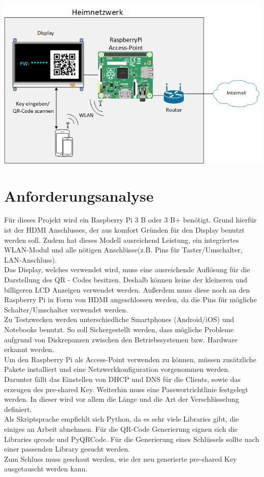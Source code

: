 \documentclass[a4paper,11pt,singlespacing]{article}
\begin{document}
	\includegraphics[scale=0.6]{skizze}
	
	\section{Anforderungsanalyse}

	Für dieses Projekt wird ein Raspberry Pi 3 B oder 3 B+ benötigt. Grund hierfür ist der HDMI Anschlusses, der aus komfort Gründen für den Display benutzt werden soll. Zudem hat dieses Modell ausreichend Leistung, ein integriertes WLAN-Modul und alle nötigen Anschlüsse(z.B. Pins für Taster/Umschalter, LAN-Anschluss). \\
	Das Display, welches verwendet wird, muss eine ausreichende Auflösung für die Darstellung des QR - Codes besitzen. Deshalb können keine der kleineren und billigeren LCD Anzeigen verwendet werden. Außerdem muss diese noch an den Raspberry Pi in Form von HDMI angeschlossen werden, da die Pins für mögliche Schalter/Umschalter verwendet werden. \\
	Zu Testzwecken werden unterschiedliche Smartphones (Android/iOS) und Notebooks benutzt. So soll Sichergestellt werden, dass mögliche Probleme aufgrund von Diskrepanzen zwischen den Betriebssystemen bzw. Hardware erkannt werden.\\
	Um den Raspberry Pi als Access-Point verwenden zu können, müssen zusätzliche Pakete installiert und eine Netzwerkkonfiguration vorgenommen werden. Darunter fällt das Einstellen von DHCP und DNS für die Clients, sowie das erzeugen des pre-shared Key. Weiterhin muss eine Passwortrichtlinie festgelegt werden. In dieser wird vor allem die Länge und die Art der Verschlüsselung definiert.\\
	Als Skriptsprache empfiehlt sich Python, da es sehr viele Libraries gibt, die einiges an Arbeit abnehmen. Für die QR-Code Generierung eignen sich die Libraries qrcode und PyQRCode. Für die Generierung eines Schlüssels sollte nach einer passenden Library gesucht werden.\\
	Zum Schluss muss geschaut werden, wie der neu generierte pre-shared Key ausgetauscht werden kann.\\
	
\end{document}

